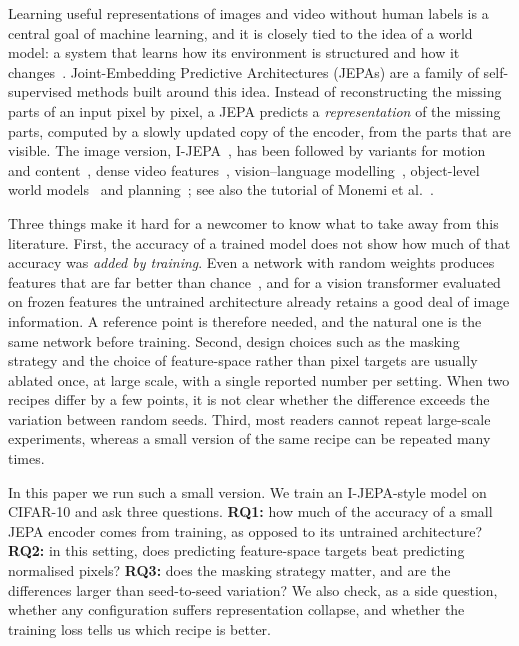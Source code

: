 \documentclass[pdflatex,sn-basic]{sn-jnl}%
\begin{document}
Learning useful representations of images and video without human labels is a central goal of machine learning, and it is closely tied to the idea of a world model: a system that learns how its environment is structured and how it changes~\cite{ha2018worldmodels,lyu2026survey}. Joint-Embedding Predictive Architectures (JEPAs) are a family of self-supervised methods built around this idea. Instead of reconstructing the missing parts of an input pixel by pixel, a JEPA predicts a \emph{representation} of the missing parts, computed by a slowly updated copy of the encoder, from the parts that are visible. The image version, I-JEPA~\cite{assran2023ijepa}, has been followed by variants for motion and content~\cite{bardes2023mcjepa}, dense video features~\cite{murlabadia2026vjepa21}, vision--language modelling~\cite{chen2025vljepa}, object-level world models~\cite{nam2026cjepa} and planning~\cite{zhang2026hierarchical,destrade2025value}; see also the tutorial of Monemi et al.~\cite{monemi2025tutorial}.

Three things make it hard for a newcomer to know what to take away from this literature. First, the accuracy of a trained model does not show how much of that accuracy was \emph{added by training}. Even a network with random weights produces features that are far better than chance~\cite{saxe2011random}, and for a vision transformer evaluated on frozen features the untrained architecture already retains a good deal of image information. A reference point is therefore needed, and the natural one is the same network before training. Second, design choices such as the masking strategy and the choice of feature-space rather than pixel targets are usually ablated once, at large scale, with a single reported number per setting. When two recipes differ by a few points, it is not clear whether the difference exceeds the variation between random seeds. Third, most readers cannot repeat large-scale experiments, whereas a small version of the same recipe can be repeated many times.

In this paper we run such a small version. We train an I-JEPA-style model on CIFAR-10 and ask three questions.
\textbf{RQ1:} how much of the accuracy of a small JEPA encoder comes from training, as opposed to its untrained architecture?
\textbf{RQ2:} in this setting, does predicting feature-space targets beat predicting normalised pixels?
\textbf{RQ3:} does the masking strategy matter, and are the differences larger than seed-to-seed variation?
We also check, as a side question, whether any configuration suffers representation collapse, and whether the training loss tells us which recipe is better.
\end{document}
